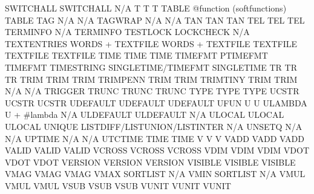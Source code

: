 \documentclass[letterpaper,10pt,english]{sphinxmanual}
\begin{document}
\begin{description}
SWITCHALL               SWITCHALL                    N/A
T                       T                            T
TABLE                   @function (softfunctions)    TABLE
TAG                     N/A                          N/A
TAGWRAP                 N/A                          N/A
TAN                     TAN                          TAN
TEL                     TEL                          TEL
TERMINFO                N/A                          TERMINFO
TESTLOCK                LOCKCHECK                    N/A
TEXTENTRIES             WORDS + TEXTFILE             WORDS + TEXTFILE
TEXTFILE                TEXTFILE                     TEXTFILE
TIME                    TIME                         TIME
TIMEFMT                 PTIMEFMT                     TIMEFMT
TIMESTRING              SINGLETIME/TIMEFMT           SINGLETIME
TR                      TR                           TR
TRIM                    TRIM                         TRIM
TRIMPENN                TRIM                         TRIM
TRIMTINY                TRIM                         TRIM
N/A                     N/A                          TRIGGER
TRUNC                   TRUNC                        TRUNC
TYPE                    TYPE                         TYPE
UCSTR                   UCSTR                        UCSTR
UDEFAULT                UDEFAULT                     UDEFAULT
UFUN                    U                            U
ULAMBDA                 U + \#lambda                  N/A
ULDEFAULT               ULDEFAULT                    N/A
ULOCAL                  ULOCAL                       ULOCAL
UNIQUE                  LISTDIFF/LISTUNION/LISTINTER N/A
UNSETQ                  N/A                          N/A
UPTIME                  N/A                          N/A
UTCTIME                 TIME                         TIME
V                       V                            V
VADD                    VADD                         VADD
VALID                   VALID                        VALID
VCROSS                  VCROSS                       VCROSS
VDIM                    VDIM                         VDIM
VDOT                    VDOT                         VDOT
VERSION                 VERSION                      VERSION
VISIBLE                 VISIBLE                      VISIBLE
VMAG                    VMAG                         VMAG
VMAX                    SORTLIST                     N/A
VMIN                    SORTLIST                     N/A
VMUL                    VMUL                         VMUL
VSUB                    VSUB                         VSUB
VUNIT                   VUNIT                        VUNIT

\end{description}
\end{document}
